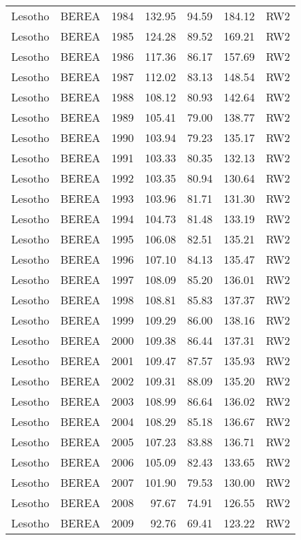 \begin{longtable}{lllrrrl}
  Lesotho & BEREA & 1984 & 132.95 & 94.59 & 184.12 & RW2 \\ 
  Lesotho & BEREA & 1985 & 124.28 & 89.52 & 169.21 & RW2 \\ 
  Lesotho & BEREA & 1986 & 117.36 & 86.17 & 157.69 & RW2 \\ 
  Lesotho & BEREA & 1987 & 112.02 & 83.13 & 148.54 & RW2 \\ 
  Lesotho & BEREA & 1988 & 108.12 & 80.93 & 142.64 & RW2 \\ 
  Lesotho & BEREA & 1989 & 105.41 & 79.00 & 138.77 & RW2 \\ 
  Lesotho & BEREA & 1990 & 103.94 & 79.23 & 135.17 & RW2 \\ 
  Lesotho & BEREA & 1991 & 103.33 & 80.35 & 132.13 & RW2 \\ 
  Lesotho & BEREA & 1992 & 103.35 & 80.94 & 130.64 & RW2 \\ 
  Lesotho & BEREA & 1993 & 103.96 & 81.71 & 131.30 & RW2 \\ 
  Lesotho & BEREA & 1994 & 104.73 & 81.48 & 133.19 & RW2 \\ 
  Lesotho & BEREA & 1995 & 106.08 & 82.51 & 135.21 & RW2 \\ 
  Lesotho & BEREA & 1996 & 107.10 & 84.13 & 135.47 & RW2 \\ 
  Lesotho & BEREA & 1997 & 108.09 & 85.20 & 136.01 & RW2 \\ 
  Lesotho & BEREA & 1998 & 108.81 & 85.83 & 137.37 & RW2 \\ 
  Lesotho & BEREA & 1999 & 109.29 & 86.00 & 138.16 & RW2 \\ 
  Lesotho & BEREA & 2000 & 109.38 & 86.44 & 137.31 & RW2 \\ 
  Lesotho & BEREA & 2001 & 109.47 & 87.57 & 135.93 & RW2 \\ 
  Lesotho & BEREA & 2002 & 109.31 & 88.09 & 135.20 & RW2 \\ 
  Lesotho & BEREA & 2003 & 108.99 & 86.64 & 136.02 & RW2 \\ 
  Lesotho & BEREA & 2004 & 108.29 & 85.18 & 136.67 & RW2 \\ 
  Lesotho & BEREA & 2005 & 107.23 & 83.88 & 136.71 & RW2 \\ 
  Lesotho & BEREA & 2006 & 105.09 & 82.43 & 133.65 & RW2 \\ 
  Lesotho & BEREA & 2007 & 101.90 & 79.53 & 130.00 & RW2 \\ 
  Lesotho & BEREA & 2008 & 97.67 & 74.91 & 126.55 & RW2 \\ 
  Lesotho & BEREA & 2009 & 92.76 & 69.41 & 123.22 & RW2 \\ 

\end{longtable}
